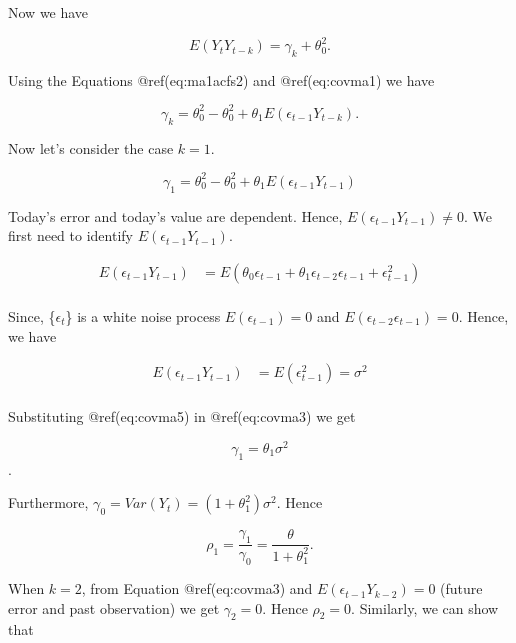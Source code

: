 \documentclass[
  11pt,
  a4paper,
]{report}
\begin{document}
Now we have

\begin{equation}
  \label{eq:covma1}
  E(Y_t Y_{t-k}) = \gamma_k + \theta_0^2.
\end{equation}

Using the Equations @ref(eq:ma1acfs2) and @ref(eq:covma1) we have

\begin{equation}
  \label{eq:covma2}
  \gamma_k = \theta_0^2 - \theta_0^2 + \theta_1E(\epsilon_{t-1}Y_{t-k}).
\end{equation}

Now let's consider the case \(k=1\).

\begin{equation}
  \label{eq:covma3}
  \gamma_1 = \theta_0^2 - \theta_0^2 + \theta_1E(\epsilon_{t-1}Y_{t-1})
\end{equation}

Today's error and today's value are dependent. Hence,
\(E(\epsilon_{t-1}Y_{t-1}) \neq 0.\) We first need to identify
\(E(\epsilon_{t-1}Y_{t-1})\).

\begin{equation}
  \label{eq:covma4}
\begin{aligned}
E(\epsilon_{t-1}Y_{t-1}) &= E(\theta_0 \epsilon_{t-1} + \theta_1 \epsilon_{t-2} \epsilon_{t-1}+ \epsilon_{t-1}^2)\\
\end{aligned}
\end{equation}

Since, \{\(\epsilon_t\)\} is a white noise process
\(E(\epsilon_{t-1}) = 0\) and \(E(\epsilon_{t-2} \epsilon_{t-1}) = 0\).
Hence, we have

\begin{equation}
  \label{eq:covma5}
\begin{aligned}
E(\epsilon_{t-1}Y_{t-1}) &= E(\epsilon_{t-1}^2)=\sigma^2\\
\end{aligned}
\end{equation}

Substituting @ref(eq:covma5) in @ref(eq:covma3) we get

\[\gamma_1=\theta_1\sigma^2\].

Furthermore, \(\gamma_0 = Var(Y_t)=  (1+\theta_1^2)\sigma^2\). Hence

\[\rho_1=\frac{\gamma_1}{\gamma_0}=\frac{\theta}{1+\theta_1^2}.\]

When \(k=2\), from Equation @ref(eq:covma3) and
\(E(\epsilon_{t-1}Y_{k-2}) = 0\) (future error and past observation) we
get \(\gamma_2=0\). Hence \(\rho_2=0\). Similarly, we can show that
\end{document}

